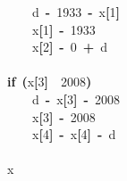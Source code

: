 \documentclass[a4paper]{article}
\newcommand{\hlnumber}[1]{\textcolor[rgb]{0.0823529411764706,0.0784313725490196,0.709803921568627}{#1}}%
\newcommand{\hlkeyword}[1]{\textcolor[rgb]{0,0,0}{\textbf{#1}}}%
\newcommand{\hlassignement}[1]{\textcolor[rgb]{0.215686274509804,0.215686274509804,0.384313725490196}{\textbf{#1}}}%
\newcommand{\hlsymbol}[1]{\textcolor[rgb]{0,0,0}{#1}}%
\newcommand{\hlprompt}[1]{\textcolor[rgb]{0,0,0}{#1}}%
\newcommand{\hlstd}[1]{\textcolor[rgb]{0,0,0}{#1}}%
\newenvironment{Houtput}{\raggedright}{%
%
}
\begin{document}
\begin{Houtput}
\hlstd{}\hlprompt{{\ }}{\ }{\ }{\ }{\ }{\ }{\ }{\ }{\ }\hlsymbol{d}{\ }\hlassignement{\usebox{\hlnormalsizeboxlessthan}-}{\ }\hlnumber{1933}{\ }\hlkeyword{-}{\ }\hlsymbol{x}\hlkeyword{[}\hlnumber{1}\hlkeyword{]}\hspace*{\fill}\\
\hlstd{}\hlprompt{{\ }}{\ }{\ }{\ }{\ }{\ }{\ }{\ }{\ }\hlsymbol{x}\hlkeyword{[}\hlnumber{1}\hlkeyword{]}{\ }\hlassignement{\usebox{\hlnormalsizeboxlessthan}-}{\ }\hlnumber{1933}\hspace*{\fill}\\
\hlstd{}\hlprompt{{\ }}{\ }{\ }{\ }{\ }{\ }{\ }{\ }{\ }\hlsymbol{x}\hlkeyword{[}\hlnumber{2}\hlkeyword{]}{\ }\hlassignement{\usebox{\hlnormalsizeboxlessthan}-}{\ }\hlnumber{0}{\ }\hlkeyword{+}{\ }\hlsymbol{d}\hspace*{\fill}\\
\hlstd{}\hlprompt{{\ }}{\ }{\ }{\ }{\ }\hlkeyword{\usebox{\hlnormalsizeboxclosebrace}}\hspace*{\fill}\\
\hlstd{}\hlprompt{{\ }}{\ }{\ }{\ }{\ }\hlkeyword{if}\hlkeyword{}{\ }\hlkeyword{(}\hlsymbol{x}\hlkeyword{[}\hlnumber{3}\hlkeyword{]}{\ }\hlkeyword{\usebox{\hlnormalsizeboxgreaterthan}}{\ }\hlnumber{2008}\hlkeyword{)}{\ }\hlkeyword{\usebox{\hlnormalsizeboxopenbrace}}\hspace*{\fill}\\
\hlstd{}\hlprompt{{\ }}{\ }{\ }{\ }{\ }{\ }{\ }{\ }{\ }\hlsymbol{d}{\ }\hlassignement{\usebox{\hlnormalsizeboxlessthan}-}{\ }\hlsymbol{x}\hlkeyword{[}\hlnumber{3}\hlkeyword{]}{\ }\hlkeyword{-}{\ }\hlnumber{2008}\hspace*{\fill}\\
\hlstd{}\hlprompt{{\ }}{\ }{\ }{\ }{\ }{\ }{\ }{\ }{\ }\hlsymbol{x}\hlkeyword{[}\hlnumber{3}\hlkeyword{]}{\ }\hlassignement{\usebox{\hlnormalsizeboxlessthan}-}{\ }\hlnumber{2008}\hspace*{\fill}\\
\hlstd{}\hlprompt{{\ }}{\ }{\ }{\ }{\ }{\ }{\ }{\ }{\ }\hlsymbol{x}\hlkeyword{[}\hlnumber{4}\hlkeyword{]}{\ }\hlassignement{\usebox{\hlnormalsizeboxlessthan}-}{\ }\hlsymbol{x}\hlkeyword{[}\hlnumber{4}\hlkeyword{]}{\ }\hlkeyword{-}{\ }\hlsymbol{d}\hspace*{\fill}\\
\hlstd{}\hlprompt{{\ }}{\ }{\ }{\ }{\ }\hlkeyword{\usebox{\hlnormalsizeboxclosebrace}}\hspace*{\fill}\\
\hlstd{}\hlprompt{{\ }}{\ }{\ }{\ }{\ }\hlsymbol{x}\hlsymbol{}\hspace*{\fill}\\

\end{Houtput}
\end{document}
